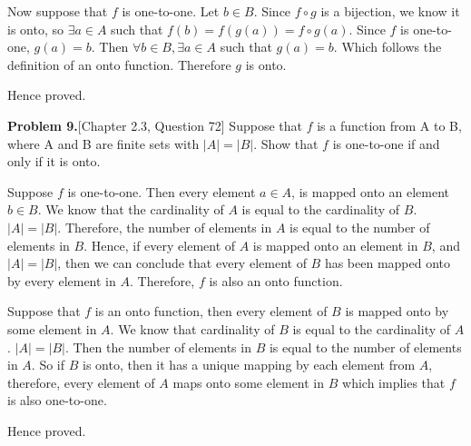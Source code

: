 \documentclass[addpoints]{exam}
\begin{document}
\begin{sloppypar}
\begin{questions}
\begin{solution}
\begin{enumerate}[(a)]
                Now suppose that $f$ is one-to-one. Let $ b \in B $. Since $ f \circ g $ is a bijection, we know it is onto, so $ \exists a \in A $ such that $ f(b) = f(g(a)) = f \circ g (a) $. Since $f$ is one-to-one, $ g(a) = b $. Then $ \forall b \in B, \exists a \in A $ such that $ g(a) = b $. Which follows the definition of an onto function. Therefore $g$ is onto. 
                
                Hence proved. 
            \end{enumerate}
        \end{solution}
    \question\textbf{Problem 9.}[Chapter 2.3, Question 72]
    Suppose that $f$ is a function from A to B, where A and B
    are finite sets with $ \lvert A \rvert =  \lvert B \rvert$. Show that $f$ is one-to-one if
    and only if it is onto.
        \begin{solution}
            Suppose $f$ is one-to-one. Then every element $a \in A$, is mapped onto an element $b \in B$. We know that the cardinality of $A$ is equal to the cardinality of $B$. $ |A| = |B| $. Therefore, the number of elements in $A$ is equal to the number of elements in $B$. Hence, if every element of $A$ is mapped onto an element in $B$, and $|A| = |B|$, then we can conclude that every element of $B$ has been mapped onto by every element in $A$. Therefore, $f$ is also an onto function. 

            Suppose that $f$ is an onto function, then every element of $B$ is mapped onto by some element in $A$. We know that cardinality of $B$ is equal to the cardinality of $A$. $|A| = |B|$. Then the number of elements in $B$ is equal to the number of elements in $A$. So if $B$ is onto, then it has a unique mapping by each element from $A$, therefore, every element of $A$ maps onto some element in $B$ which implies that $f$ is also one-to-one.

            Hence proved.
        \end{solution}
\end{questions}
\end{sloppypar}
\end{document}
